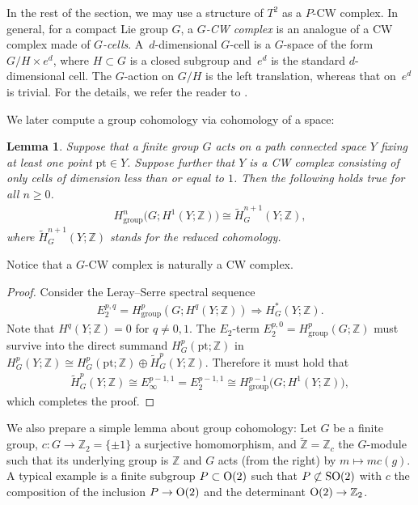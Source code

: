 \documentclass[11pt]{article}
\newtheorem{lem}[thm]{Lemma}
\theoremstyle{definition}
\newcommand{\Z}{\mathbb{Z}}
\newcommand{\pt}{\mathrm{pt}}
\begin{document}
In the rest of the section, we may use a structure of $T^2$ as a $P$-CW complex. In general, for a compact Lie group $G$, a \textit{$G$-CW complex} is an analogue of a CW complex made of \textit{$G$-cells}. A~$d$-dimensional $G$-cell is a $G$-space of the form $G/H \times e^d$, where $H \subset G$ is a closed subgroup and~$e^d$ is the standard $d$-dimensional cell. The $G$-action on $G/H$ is the left translation, whereas that on~$e^d$ is trivial. For the details, we refer the reader to \cite{May}.

We later compute a group cohomology via cohomology of a space:

\begin{lem} \label{lem:1_dim_complex}
Suppose that a finite group $G$ acts on a path connected space $Y$ fixing at least one point $\pt \in Y$. Suppose further that $Y$ is a CW complex consisting of only cells of dimension less than or equal to $1$. Then the following holds true for all $n \ge 0$.
\begin{gather*}
H^n_{\mathrm{group}}\big(G; H^1(Y; \Z)\big) \cong \tilde{H}^{n+1}_G(Y; \Z),
\end{gather*}
where $\tilde{H}^{n+1}_G(Y; \Z)$ stands for the reduced cohomology.
\end{lem}

Notice that a $G$-CW complex is naturally a CW complex.

\begin{proof}
Consider the Leray--Serre spectral sequence
\begin{gather*}
E_2^{p, q} = H^p_{\mathrm{group}}(G; H^q(Y; \Z))\Longrightarrow H^*_G(Y; \Z).
\end{gather*}
Note that $H^q(Y; \Z) = 0$ for $q \neq 0, 1$. The $E_2$-term $E_2^{p, 0} = H^p_{\mathrm{group}}(G; \Z)$ must survive into the direct summand $H^p_G(\pt; \Z)$ in $H^p_G(Y; \Z) \cong H^p_G(\pt; \Z) \oplus \tilde{H}^p_G(Y; \Z)$. Therefore it must hold that
\begin{gather*}
\tilde{H}^p_G(Y; \Z) \cong E^{p-1, 1}_\infty = E^{p-1, 1}_2\cong H^{p-1}_{\mathrm{group}}\big(G; H^1(Y; \Z)\big),
\end{gather*}
which completes the proof.
\end{proof}

We also prepare a simple lemma about group cohomology: Let $G$ be a f\/inite group, $c \colon G \to \Z_2 = \{ \pm 1 \}$ a surjective homomorphism, and $\tilde{\Z} = \Z_c$ the $G$-module such that its underlying group is $\Z$ and $G$ acts (from the right) by $m \mapsto m c(g)$. A typical example is a f\/inite subgroup $P \subset {\rm O}(2)$ such that $P \not\subset {\rm SO}(2)$ with $c$ the composition of the inclusion $P \to {\rm O}(2)$ and the determinant ${\rm O}(2) \to \Z_2$.
\end{document}
